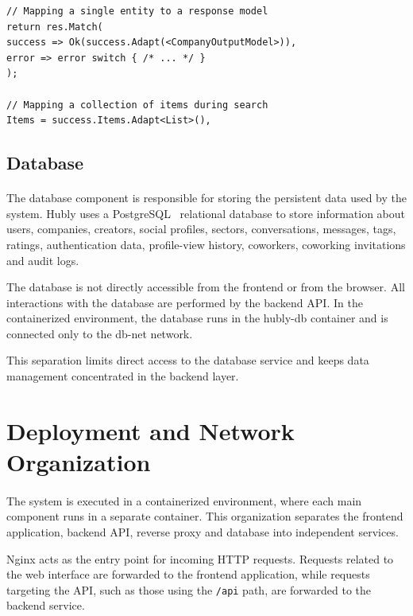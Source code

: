 \begin{lstlisting}[caption={Concise domain-to-DTO transformation}, label={lst:mapster-controller}]
// Mapping a single entity to a response model
return res.Match(
success => Ok(success.Adapt(<CompanyOutputModel>)),
error => error switch { /* ... */ }
);

// Mapping a collection of items during search
Items = success.Items.Adapt<List>(),
\end{lstlisting}

\subsection{Database}

\paragraph{}The database component is responsible for storing the persistent data used by the system. Hubly uses a PostgreSQL~\cite{postgreSql} relational database to store information about users, companies, creators, social profiles, sectors, conversations, messages, tags, ratings, authentication data, profile-view history, coworkers, coworking invitations and audit logs.

The database is not directly accessible from the frontend or from the browser. All interactions with the database are performed by the backend API. In the containerized environment, the database runs in the hubly-db container and is connected only to the db-net network.

This separation limits direct access to the database service and keeps data management concentrated in the backend layer.

\section{Deployment and Network Organization}

\paragraph{}The system is executed in a containerized environment, where each main component runs in a separate container. This organization separates the frontend application, backend API, reverse proxy and database into independent services.

Nginx acts as the entry point for incoming HTTP requests. Requests related to the web interface are forwarded to the frontend application, while requests targeting the API, such as those using the \texttt{/api} path, are forwarded to the backend service.

